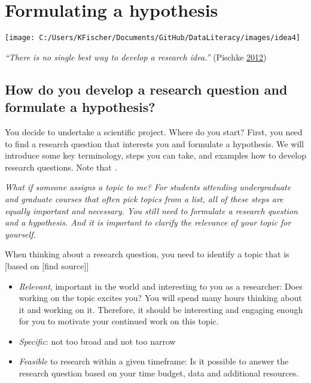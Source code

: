 \documentclass[
]{book}
\providecommand{\tightlist}{%
  \setlength{\itemsep}{0pt}\setlength{\parskip}{0pt}}
\begin{document}
\hypertarget{hypothesis}{%
\chapter{Formulating a hypothesis}\label{hypothesis}}

\begin{center}\texttt{[image: C:/Users/KFischer/Documents/GitHub/DataLiteracy/images/idea4]} \end{center}

\emph{``There is no single best way to develop a research idea.''}
(Pischke \protect\hyperlink{ref-pischke_how_2012}{2012})

\hypertarget{how-do-you-develop-a-research-question-and-formulate-a-hypothesis}{%
\section{How do you develop a research question and formulate a
hypothesis?}\label{how-do-you-develop-a-research-question-and-formulate-a-hypothesis}}

You decide to undertake a scientific project. Where do you start? First,
you need to find a research question that interests you and formulate a
hypothesis. We will introduce some key terminology, steps you can take,
and examples how to develop research questions. Note that .

\emph{What if someone assigns a topic to me? For students attending
undergraduate and graduate courses that often pick topics from a list,
all of these steps are equally important and necessary. You still need
to formulate a research question and a hypothesis. And it is important
to clarify the relevance of your topic for yourself.}

When thinking about a research question, you need to identify a topic
that is {[}based on {[}find source{]}{]}

\begin{itemize}
\tightlist
\item
  \emph{Relevant}, important in the world and interesting to you as a
  researcher: Does working on the topic excites you? You will spend many
  hours thinking about it and working on it. Therefore, it should be
  interesting and engaging enough for you to motivate your continued
  work on this topic.
\item
  \emph{Specific}: not too broad and not too narrow
\item
  \emph{Feasible} to research within a given timeframe: Is it possible
  to answer the research question based on your time budget, data and
  additional resources.
\end{itemize}
\end{document}
